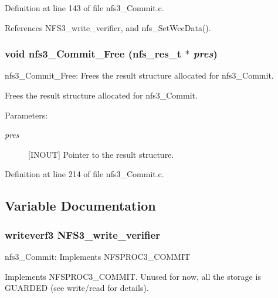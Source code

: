 Definition at line 143 of file nfs3\_\-Commit.c.

References NFS3\_\-write\_\-verifier, and nfs\_\-Set\-Wcc\-Data().
\subsubsection{\setlength{\rightskip}{0pt plus 5cm}void nfs3\_\-Commit\_\-Free (nfs\_\-res\_\-t $\ast$ {\em pres})}\label{nfs3__Commit_8c_a2}


nfs3\_\-Commit\_\-Free: Frees the result structure allocated for nfs3\_\-Commit.

Frees the result structure allocated for nfs3\_\-Commit.

\begin{Desc}
\item[Parameters:]
\begin{description}
\item[{\em pres}][INOUT] Pointer to the result structure. \end{description}
\end{Desc}


Definition at line 214 of file nfs3\_\-Commit.c.

\subsection{Variable Documentation}
\subsubsection{\setlength{\rightskip}{0pt plus 5cm}writeverf3 {\bf NFS3\_\-write\_\-verifier}}\label{nfs3__Commit_8c_a0}


nfs3\_\-Commit: Implements NFSPROC3\_\-COMMIT

Implements NFSPROC3\_\-COMMIT. Unused for now, all the storage is GUARDED (see write/read for details).

